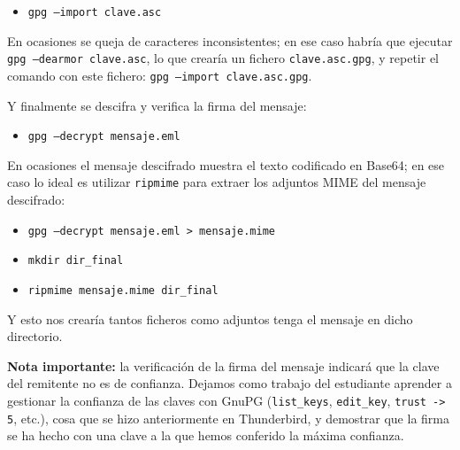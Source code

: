 \begin{itemize}[label=\textbullet]
    \item \texttt{gpg --import clave.asc}
\end{itemize}

En ocasiones se queja de caracteres inconsistentes; en ese caso habría que ejecutar
\texttt{gpg --dearmor clave.asc}, lo que crearía un fichero \texttt{clave.asc.gpg}, y repetir el comando con
este fichero: \texttt{gpg --import clave.asc.gpg}.

Y finalmente se descifra y verifica la firma del mensaje:

\begin{itemize}[label=\textbullet]
    \item \texttt{gpg --decrypt mensaje.eml}
\end{itemize}

En ocasiones el mensaje descifrado muestra el texto codificado en Base64; en ese caso lo ideal es utilizar
\texttt{ripmime} para extraer los adjuntos MIME del mensaje descifrado:

\begin{itemize}[label=\textbullet]
    \item \texttt{gpg --decrypt mensaje.eml > mensaje.mime}
    \item \texttt{mkdir dir\_final}
    \item \texttt{ripmime mensaje.mime dir\_final}
\end{itemize}

Y esto nos crearía tantos ficheros como adjuntos tenga el mensaje en dicho directorio.

\textbf{Nota importante:} la verificación de la firma del mensaje indicará que la clave del remitente no es de
confianza. Dejamos como trabajo del estudiante aprender a gestionar la confianza de las claves con GnuPG
(\texttt{list\_keys}, \texttt{edit\_key}, \texttt{trust -> 5}, etc.), cosa que se hizo anteriormente en Thunderbird,
y demostrar que la firma se ha hecho con una clave a la que hemos conferido la máxima confianza.
